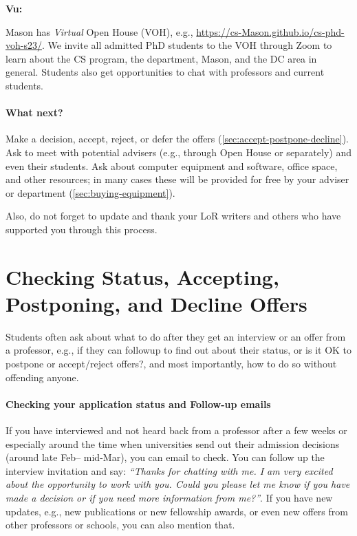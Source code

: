 \documentclass[oneside,11pt,dvipsnames]{book}
\newenvironment{commentbox}[1][]{
  \small
  \begin{mybox}
    {\small \textbf{#1}}
  }{
  \end{mybox}
}
\begin{document}
\begin{commentbox}[Vu:]
  Mason has \emph{Virtual} Open House (VOH), e.g., \url{https://cs-Mason.github.io/cs-phd-voh-s23/}. We invite all admitted PhD students to the VOH through Zoom to learn about the CS program, the department, Mason, and the DC area in general. Students also get opportunities to chat with professors and current students.
\end{commentbox}

\paragraph{What next?} Make a decision, accept, reject, or defer the offers  (\autoref{sec:accept-postpone-decline}). Ask to meet with potential advisers (e.g., through Open House or separately) and even their students. Ask about computer equipment and software, office space, and other resources; in many cases these will be provided for free by your adviser or department (\autoref{sec:buying-equipment}).

Also, do not forget to update and thank your LoR writers and others who have supported you through this process.


\section{Checking Status, Accepting, Postponing, and Decline Offers}\label{sec:accept-postpone-decline}

Students often ask about what to do after they get an interview or an offer from a professor, e.g., if they can followup to find out about their status, or is it OK to postpone or accept/reject offers?, and most importantly, how to do so without offending anyone. 

\paragraph{Checking your application status and Follow-up emails} If you have interviewed and not heard back from a professor after a few weeks or especially around the time when universities send out their admission decisions (around late Feb-- mid-Mar), you can email to check.  You can follow up the interview invitation and say: \emph{``Thanks for chatting with me. I am very excited about the opportunity to work with you.  Could you please let me know if you have made a decision or if you need more information from me?''}.  If you have new updates, e.g., new publications or new fellowship awards, or even new offers from other professors or schools, you can also mention that.
\end{document}
